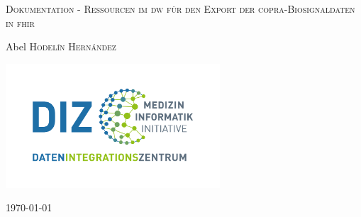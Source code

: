 \begin{titlepage}
	\thispagestyle{firstpage}
	
	\centering
	{\scshape\LARGE Dokumentation - Ressourcen im \ac{dw} für den Export der \acs{copra}-Biosignaldaten in \acs{fhir} \par} 
	\vspace{1.5cm}
		\vspace{2cm}
	{\Large Abel \textsc{Hodelín Hernández}\par} 
	\vspace{2cm}
	\includegraphics[width=8cm]{figures/diz}
	\vfill
	{\large \today\par}
	
\end{titlepage}